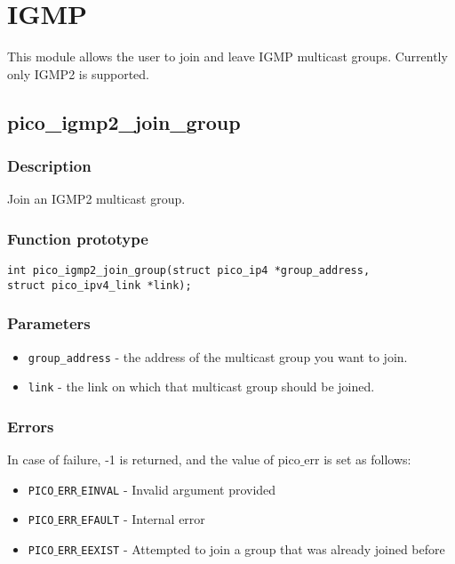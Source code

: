 \section{IGMP}

This module allows the user to join and leave IGMP multicast groups. Currently only IGMP2 is supported.


\subsection{pico\_igmp2\_join\_group}

\subsubsection*{Description}
Join an IGMP2 multicast group.

\subsubsection*{Function prototype}
\begin{verbatim}
int pico_igmp2_join_group(struct pico_ip4 *group_address,
struct pico_ipv4_link *link);
\end{verbatim}

\subsubsection*{Parameters}
\begin{itemize}[noitemsep]
\item \texttt{group\_address} - the address of the multicast group you want to join.
\item \texttt{link} - the link on which that multicast group should be joined.
\end{itemize}

\subsubsection*{Errors}
In case of failure, -1 is returned, and the value of pico$\_$err
is set as follows:

\begin{itemize}[noitemsep]
\item \texttt{PICO$\_$ERR$\_$EINVAL}          - Invalid argument provided
\item \texttt{PICO$\_$ERR$\_$EFAULT}          - Internal error
\item \texttt{PICO$\_$ERR$\_$EEXIST}          - Attempted to join a group that was already joined before
\end{itemize}

